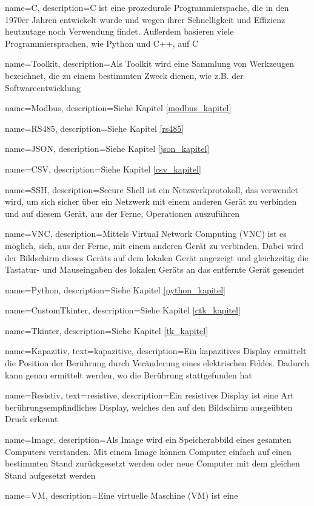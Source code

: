 {
	name=C,
	description={C ist eine prozedurale Programmierspache, die in den 1970er Jahren entwickelt wurde und wegen ihrer Schnelligkeit und Effizienz heutzutage noch Verwendung findet. Außerdem basieren viele Programmiersprachen, wie \zB Python und C++, auf C}
}

{
	name=Toolkit,
	description={Als Toolkit wird eine Sammlung von Werkzeugen bezeichnet, die zu einem bestimmten Zweck dienen, wie z.B. der Softwareentwicklung}
}

{
	name=Modbus,
	description={Siehe Kapitel \ref{modbus_kapitel} }
}

{
	name=RS485,
	description={Siehe Kapitel \ref{rs485} }
}

{
	name=JSON,
	description={Siehe Kapitel \ref{json_kapitel} }
}

{
	name=CSV,
	description={Siehe Kapitel \ref{csv_kapitel} }
}

{
	name=SSH,
	description={Secure Shell ist ein Netzwerkprotokoll, das verwendet wird, um sich sicher über ein Netzwerk mit einem anderen Gerät zu verbinden und auf diesem Gerät, aus der Ferne, Operationen auszuführen}
}

{
	name=VNC,
	description={Mittels Virtual Network Computing (VNC) ist es möglich, sich, aus der Ferne, mit einem anderen Gerät zu verbinden. Dabei wird der Bildschirm dieses Geräts auf dem lokalen Gerät angezeigt und gleichzeitig die Tastatur- und Mauseingaben des lokalen Geräts an das entfernte Gerät gesendet}
}

{
	name=Python,
	description={Siehe Kapitel \ref{python_kapitel} }
}

{
	name=CustomTkinter,
	description={Siehe Kapitel \ref{ctk_kapitel} }
}

{
	name=Tkinter,
	description={Siehe Kapitel \ref{tk_kapitel} }
}

{
	name=Kapazitiv,
    	text=kapazitive,
	description={Ein kapazitives Display ermittelt die Position der Berührung durch Veränderung eines elektrischen Feldes. Dadurch kann genau ermittelt werden, wo die Berührung stattgefunden hat}
}

{
	name=Resistiv,
    	text=resistive,
	description={Ein resistives Display ist eine Art berührungsempfindliches Display, welches den auf den Bildschirm ausgeübten Druck erkennt}
}

{
	name=Image,
	description={Als Image wird ein Speicherabbild eines gesamten Computers verstanden. Mit einem Image können Computer einfach auf einen bestimmten Stand zurückgesetzt werden oder neue Computer mit dem gleichen Stand aufgesetzt werden}
}

{
	name=VM,
	description={Eine virtuelle Maschine (VM) ist eine }
}